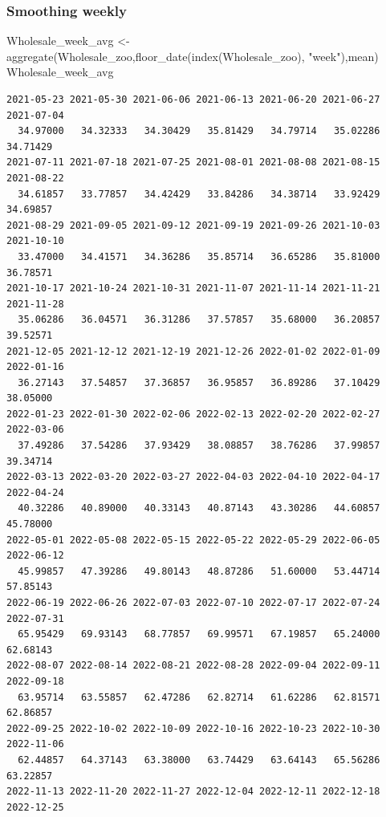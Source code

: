 \documentclass[
  letterpaper,
  DIV=11,
  numbers=noendperiod]{scrartcl}
\newenvironment{Shaded}{\begin{snugshade}}{\end{snugshade}}
\newcommand{\FunctionTok}[1]{\textcolor[rgb]{0.28,0.35,0.67}{#1}}
\newcommand{\NormalTok}[1]{\textcolor[rgb]{0.00,0.23,0.31}{#1}}
\newcommand{\OtherTok}[1]{\textcolor[rgb]{0.00,0.23,0.31}{#1}}
\newcommand{\StringTok}[1]{\textcolor[rgb]{0.13,0.47,0.30}{#1}}
\begin{document}
\subsubsection{Smoothing weekly}\label{smoothing-weekly}

\begin{Shaded}
\begin{Highlighting}[]
\NormalTok{Wholesale\_week\_avg }\OtherTok{\textless{}{-}}\FunctionTok{aggregate}\NormalTok{(Wholesale\_zoo,}\FunctionTok{floor\_date}\NormalTok{(}\FunctionTok{index}\NormalTok{(Wholesale\_zoo), }\StringTok{"week"}\NormalTok{),mean)}
\NormalTok{Wholesale\_week\_avg}
\end{Highlighting}
\end{Shaded}

\begin{verbatim}
2021-05-23 2021-05-30 2021-06-06 2021-06-13 2021-06-20 2021-06-27 2021-07-04 
  34.97000   34.32333   34.30429   35.81429   34.79714   35.02286   34.71429 
2021-07-11 2021-07-18 2021-07-25 2021-08-01 2021-08-08 2021-08-15 2021-08-22 
  34.61857   33.77857   34.42429   33.84286   34.38714   33.92429   34.69857 
2021-08-29 2021-09-05 2021-09-12 2021-09-19 2021-09-26 2021-10-03 2021-10-10 
  33.47000   34.41571   34.36286   35.85714   36.65286   35.81000   36.78571 
2021-10-17 2021-10-24 2021-10-31 2021-11-07 2021-11-14 2021-11-21 2021-11-28 
  35.06286   36.04571   36.31286   37.57857   35.68000   36.20857   39.52571 
2021-12-05 2021-12-12 2021-12-19 2021-12-26 2022-01-02 2022-01-09 2022-01-16 
  36.27143   37.54857   37.36857   36.95857   36.89286   37.10429   38.05000 
2022-01-23 2022-01-30 2022-02-06 2022-02-13 2022-02-20 2022-02-27 2022-03-06 
  37.49286   37.54286   37.93429   38.08857   38.76286   37.99857   39.34714 
2022-03-13 2022-03-20 2022-03-27 2022-04-03 2022-04-10 2022-04-17 2022-04-24 
  40.32286   40.89000   40.33143   40.87143   43.30286   44.60857   45.78000 
2022-05-01 2022-05-08 2022-05-15 2022-05-22 2022-05-29 2022-06-05 2022-06-12 
  45.99857   47.39286   49.80143   48.87286   51.60000   53.44714   57.85143 
2022-06-19 2022-06-26 2022-07-03 2022-07-10 2022-07-17 2022-07-24 2022-07-31 
  65.95429   69.93143   68.77857   69.99571   67.19857   65.24000   62.68143 
2022-08-07 2022-08-14 2022-08-21 2022-08-28 2022-09-04 2022-09-11 2022-09-18 
  63.95714   63.55857   62.47286   62.82714   61.62286   62.81571   62.86857 
2022-09-25 2022-10-02 2022-10-09 2022-10-16 2022-10-23 2022-10-30 2022-11-06 
  62.44857   64.37143   63.38000   63.74429   63.64143   65.56286   63.22857 
2022-11-13 2022-11-20 2022-11-27 2022-12-04 2022-12-11 2022-12-18 2022-12-25 

\end{verbatim}
\end{document}
